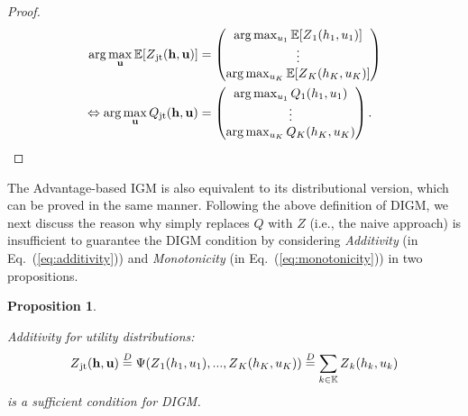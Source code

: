 \documentclass[twoside,11pt]{article}
\newcommand{\jointaction}{\mathbf{u}}
\newcommand{\action}{u}
\newcommand{\jointobservationhistory}{\mathbf{h}}
\newcommand{\observationhistory}{h}
\newcommand{\agentspace}{\mathbb{K}}
\newcommand{\agentcounter}{k}
\newcommand{\numberofagents}{K}
\newcommand{\utilityexp}{Q}
\newcommand{\utility}{Z}
\newcommand{\joint}{\mathrm{jt}}
\newcommand{\meandecompositionfunction}{\Psi}
\newcommand{\additivity}{\textit{Additivity}}
\newcommand{\monotonicity}{\textit{Monotonicity}}
\newcommand{\eqd}{\overset{D}{=}}
\newcounter{theorem0}
\newcounter{proposition0}
\newcounter{definition0}
\newtheorem{proposition}[proposition0]{Proposition}
\begin{document}
\begin{proof}
\begin{equation}
\begin{aligned}
\arg\max_\jointaction{} \mathbb{E}[\utility{}_{\joint{}}(\jointobservationhistory{},\jointaction{})] &=
\begin{pmatrix}
\arg\max_{\action{}_1} \mathbb{E}[\utility{}_1(\observationhistory{}_1,\action{}_1)]\\
\vdots \\
\arg\max_{\action{}_\numberofagents{}} \mathbb{E}[\utility{}_\numberofagents{}(\observationhistory{}_\numberofagents{},\action{}_\numberofagents{})]
\end{pmatrix}\\
\Leftrightarrow\arg\max_\jointaction{} \utilityexp{}_{\joint{}}(\jointobservationhistory{},\jointaction{}) &=
\begin{pmatrix}
\arg\max_{\action{}_1} \utilityexp{}_1(\observationhistory{}_1,\action{}_1)\\
\vdots \\
\arg\max_{\action{}_\numberofagents{}} \utilityexp{}_\numberofagents{}(\observationhistory{}_\numberofagents{},\action{}_\numberofagents{})
\end{pmatrix}.
\end{aligned}
\notag{}
\end{equation}
\end{proof} The Advantage-based IGM is also equivalent to its distributional version, which can be proved in the same manner.
Following the above definition of DIGM,
we next discuss the reason why simply replaces $\utilityexp$ with $\utility$ (i.e., the naive approach) is insufficient to guarantee the DIGM condition by considering \additivity{} (in Eq.~(\ref{eq:additivity})) and \monotonicity{} (in Eq.~(\ref{eq:monotonicity})) in two propositions.
\begin{proposition}
\label{prop:distributional_additivity}

\additivity{} for utility distributions:
\begin{equation}
\utility{}_{\joint{}}(\jointobservationhistory{},{\jointaction{}}) \eqd \meandecompositionfunction{}(\utility{}_1(\observationhistory{}_1,\action{}_1), ..., \utility{}_\numberofagents(\observationhistory{}_\numberofagents,\action{}_\numberofagents)) \eqd \sum_{\agentcounter{}\in\agentspace{}} \utility{}_{\agentcounter{}}(\observationhistory{}_{\agentcounter{}},\action{}_{\agentcounter{}})
\notag{}
\end{equation}
is a sufficient condition for DIGM.

\end{proposition}
\end{document}
